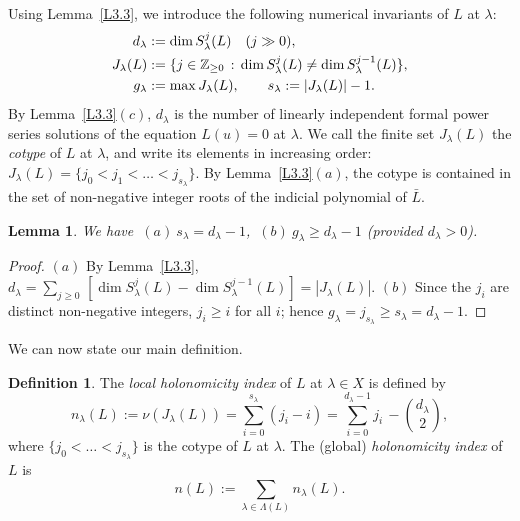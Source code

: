 \documentclass[11pt,reqno]{amsart}
\theoremstyle{plain}
\newtheorem{lemma}{Lemma}[section]
\theoremstyle{definition}
\newtheorem{definition}{Definition}
\theoremstyle{remark}
\numberwithin{equation}{section}
\newcommand{\Z}{\mathbb{Z}}
\begin{document}
Using Lemma~\ref{L3.3}, we introduce the following numerical invariants of $L$ at $\lambda$:
\begin{align}
  d_\lambda & := \dim S^j_\lambda(L) \quad (j \gg 0) , \notag \\
  J_\lambda(L) & := \{ j \in \Z_{\ge 0} \, : \, \dim S^j_\lambda(L) \ne \dim S^{j-1}_\lambda(L) \} ,
  \label{E34} \\
  g_\lambda & := \max J_\lambda(L) , \qquad s_\lambda := |J_\lambda(L)| - 1 . \notag
\end{align}
By Lemma~\ref{L3.3}$(c)$, $d_\lambda$ is the number of linearly independent formal power series
solutions of the equation $L(u) = 0$ at $\lambda$. We call the finite set $J_\lambda(L)$ the
\emph{cotype} of $L$ at $\lambda$, and write its elements in increasing order:
$J_\lambda(L) = \{ j_0 < j_1 < \ldots < j_{s_\lambda} \}$. By Lemma~\ref{L3.3}$(a)$, the cotype is
contained in the set of non-negative integer roots of the indicial polynomial of $\bar L$.

\begin{lemma}
\label{L3.4}
We have $\ (a)\ s_\lambda = d_\lambda - 1$, $\ (b)\ g_\lambda \ge d_\lambda - 1$ (provided
$d_\lambda > 0$).
\end{lemma}

\begin{proof}
$(a)$ By Lemma~\ref{L3.3}, $d_\lambda = \sum_{j \ge 0}\, [\dim S^j_\lambda(L) - \dim
S^{j-1}_\lambda(L)] = |J_\lambda(L)|$. $(b)$ Since the $j_i$ are distinct non-negative integers,
$j_i \ge i$ for all $i$; hence $g_\lambda = j_{s_\lambda} \ge s_\lambda = d_\lambda - 1$.
\end{proof}

We can now state our main definition.

\begin{definition}
\label{D5}
The \emph{local holonomicity index} of $L$ at $\lambda \in X$ is defined by
\begin{equation}
\label{E35}
  n_\lambda(L) := \nu(J_\lambda(L)) = \sum_{i=0}^{s_\lambda} (j_i - i) = \sum_{i=0}^{d_\lambda - 1}
  j_i \, - \binom{d_\lambda}{2} ,
\end{equation}
where $\{j_0 < \ldots < j_{s_\lambda}\}$ is the cotype of $L$ at $\lambda$. The (global)
\emph{holonomicity index} of $L$ is
\begin{equation}
\label{E36}
  n(L) := \sum_{\lambda \in \Lambda(L)} n_\lambda(L) .
\end{equation}
\end{definition}
\end{document}
